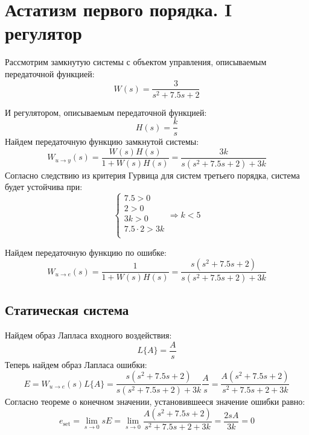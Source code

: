 \section{Астатизм первого порядка. I регулятор}

Рассмотрим замкнутую системы с объектом управления, описываемым передаточной функцией:
\begin{equation}
    W(s) = \frac{3}{s^2 + 7.5s + 2}
\end{equation}

И регулятором, описываемым передаточной функцией:
\begin{equation}
    H(s) = \frac{k}{s}
\end{equation}
Найдем передаточную функцию замкнутой системы:
\begin{equation}
    W_{u\rightarrow y}(s) = \frac{W(s)H(s)}{1 + W(s)H(s)} = \frac{3k}{s(s^2 + 7.5s + 2) + 3k}
\end{equation}
Согласно следствию из критерия Гурвица для систем третьего порядка, система будет устойчива при:
\begin{equation}
    \begin{cases}
        7.5 > 0 \\
        2 > 0 \\ 
        3k > 0 \\ 
        7.5 \cdot 2 > 3k \\
    \end{cases} \Rightarrow
    k < 5
\end{equation}

Найдем передаточную функцию по ошибке:
\begin{equation}
    W_{u\rightarrow e}(s) = \frac{1}{1 + W(s)H(s)} = \frac{s(s^2 + 7.5s + 2)}{s(s^2 + 7.5s + 2) + 3k}
\end{equation}

\subsection{Статическая система}
Найдем образ Лапласа входного воздействия:
\begin{equation}
    L\{A\} = \frac{A}{s}
\end{equation}
Теперь найдем образ Лапласа ошибки:
\begin{equation}
    E = W_{u\rightarrow e}(s)L\{A\} = \frac{s(s^2 + 7.5s + 2)}{s(s^2 + 7.5s + 2) + 3k}\frac{A}{s} = \frac{A(s^2 + 7.5s + 2)}{s^2 + 7.5s + 2 + 3k}
\end{equation}
Согласно теореме о конечном значении, установившееся значение ошибки равно:
\begin{equation}
    e_{\text{set}} = \lim_{s \to 0} sE = \lim_{s \to 0} \frac{A(s^2 + 7.5s + 2)}{s^2 + 7.5s + 2 + 3k} = \frac{2sA}{3k} = 0 
\end{equation}

